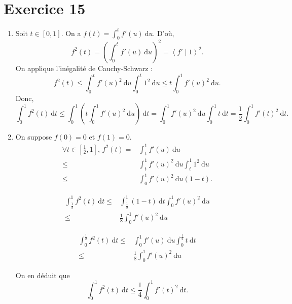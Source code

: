 \part{Exercice 15}

\begin{enumerate}
	\item Soit $t \in [0,1]$.
		On a $f(t) = \int_{0}^{t} f'(u)~\mathrm{d}u$.
		D'où, \[
			f^2(t) = \left( \int_{0}^{t} f'(u)~\mathrm{d}u \right)^2 = \left<f' \mid 1 \right>^2
		.\] On applique l'inégalité de Cauchy-Schwarz : \[
			f^2(t) \le \int_{0}^{t} f'(u)^2~\mathrm{d}u \int_{0}^{t} 1^2~\mathrm{d}u \le t \int_{0}^{1} f'(u)^2~\mathrm{d}u
		.\] Donc, \[
			\int_{0}^{1} f^2(t)~\mathrm{d}t \le \int_{0}^{1} \left( t \int_{0}^{1}f'(u)^2~\mathrm{d}u \right) ~\mathrm{d}t = \int_{0}^{1} f'(u)^2~\mathrm{d}u \int_{0}^{1} t~\mathrm{d}t = \frac{1}{2} \int_{0}^{1} f'(t)^2~\mathrm{d}t
		.\]
	\item On suppose $f(0) = 0$ et $f(1) = 0$.
		\begin{align*}
			\forall t \in \left[ \frac{1}{2},1 \right],\,
			f^2(t) =& \int_{t}^{1} f'(u)~\mathrm{d}u\\
			\le& \int_{t}^{1} f'(u)^2~\mathrm{d}u \int_{t}^{1} 1^2~\mathrm{d}u\\
			\le& \int_{0}^{1} f'(u)^2~\mathrm{d}u (1-t).
		\end{align*}

		\begin{align*}
			\int_{\frac{1}{2}}^{1} f^2(t)~\mathrm{d}t \le& \int_{\frac{1}{2}}^{1} (1-t)~\mathrm{d}t \int_{0}^{1} f'(u)^2~\mathrm{d}u\\
			\le& \frac{1}{8} \int_{0}^{1} f'(u)^2~\mathrm{d}u
		\end{align*}

		\begin{align*}
			\int_{0}^{\frac{1}{2}} f^2(t)~\mathrm{d}t \le& \int_{0}^{1} f'(u)~\mathrm{d}u \int_{0}^{\frac{1}{2}} t~\mathrm{d}t\\
			\le& \frac{1}{8} \int_{0}^{1} f'(u)^2~\mathrm{d}u
		\end{align*}

		On en déduit que \[
			\int_{0}^{1} f^2(t)~\mathrm{d}t \le \frac{1}{4} \int_{0}^{1} f'(t)^2~\mathrm{d}t
		.\]
\end{enumerate}

